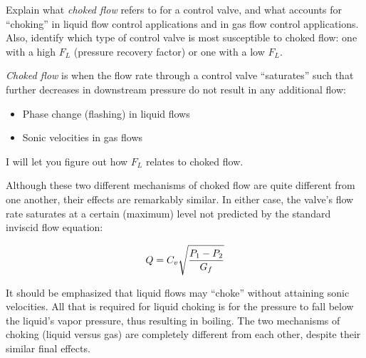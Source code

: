 

Explain what {\it choked flow} refers to for a control valve, and what accounts for ``choking'' in liquid flow control applications and in gas flow control applications.  Also, identify which type of control valve is most susceptible to choked flow: one with a high $F_L$ (pressure recovery factor) or one with a low $F_L$.







{\it Choked flow} is when the flow rate through a control valve ``saturates'' such that further decreases in downstream pressure do not result in any additional flow:

\begin{itemize}
\item{} Phase change (flashing) in liquid flows
\vskip 5pt
\item{} Sonic velocities in gas flows
\end{itemize}

I will let you figure out how $F_L$ relates to choked flow.







Although these two different mechanisms of choked flow are quite different from one another, their effects are remarkably similar.  In either case, the valve's flow rate saturates at a certain (maximum) level not predicted by the standard inviscid flow equation:

$$Q = C_v \sqrt{{P_1 - P_2} \over G_f}$$

It should be emphasized that liquid flows may ``choke'' without attaining sonic velocities.  All that is required for liquid choking is for the pressure to fall below the liquid's vapor pressure, thus resulting in boiling.  The two mechanisms of choking (liquid versus gas) are completely different from each other, despite their similar final effects.




